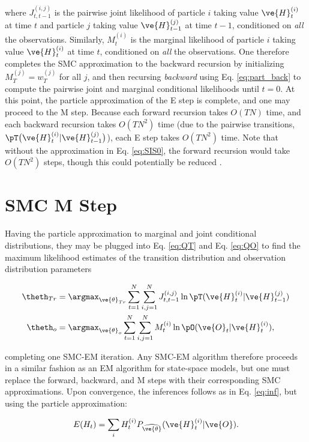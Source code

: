 \documentclass{article}
\begin{document}
\noindent where $J^{(i,j)}_{t,t-1}$ is the pairwise joint likelihood
of particle $i$ taking value $\ve{H}_t^{(i)}$ at time $t$ and particle
$j$ taking value $\ve{H}_{t-1}^{(j)}$ at time $t-1$, conditioned on
\emph{all} the observations.  Similarly, $M_t^{(i)}$ is the marginal
likelihood of particle $i$ taking value $\ve{H}_t^{(i)}$ at time $t$,
conditioned on \emph{all} the observations. One therefore completes
the SMC approximation to the backward recursion by initializing
$M_T^{(j)}=w_T^{(j)}$ for all $j$, and then recursing \emph{backward}
using Eq. \ref{eq:part_back} to compute the pairwise joint and marginal
conditional likelihoods until $t=0$.  At this point, the particle
approximation of the E step is complete, and one may proceed to the M
step. Because each forward recursion takes $O(TN)$ time, and each
backward recursion takes $O(TN^2)$ time (due to the pairwise
transitions, $\pT \big(\ve{H}^{(i)}_t | \ve{H}^{(j)}_{t-1} \big)$),
each E step takes $O(TN^2)$ time.  Note that without the approximation
in Eq. \ref{eq:SIS0}, the forward recursion would take $O(TN^2)$ steps,
though this could potentially be reduced  \cite{KlaasDoucet05}.

\section{SMC M Step}

Having the particle approximation to marginal and joint conditional distributions, they may be plugged into Eq. \ref{eq:QT} and Eq. \ref{eq:QO} to find the maximum likelihood estimates of the transition distribution and observation distribution parameters

\begin{align} \label{eq:smcQT}
\theth_{Tr} &= \argmax_{\ve{\theta}_{Tr}} \sum_{t=1}^N\sum_{i,j=1}^N J^{(i,j)}_{t,t-1}  \ln \pT
(\ve{H}_t^{(i)} |  \ve{H}_{t-1}^{(j)}) \\ \label{eq:smcQO}
\theth_o &= \argmax_{\ve{\theta}_o}  \sum_{t=1}^N \sum_{i,j=1}^N M^{(i)}_t \ln \pO (\ve{O}_t | \ve{H}_t^{(i)}),
\end{align}

\noindent completing one SMC-EM iteration.  Any SMC-EM algorithm therefore proceeds in a similar fashion as an EM algorithm for state-space models, but one must replace the forward, backward, and M steps with their corresponding SMC approximations. Upon convergence, the inferences follows as in Eq. \ref{eq:inf}, but using the particle approximation:

\begin{equation} \label{eq:smc_inf}
E(H_t) = \sum_i H_t^{(i)} P_{\widehat{\ve{\theta}}}(\ve{H}_t^{(i)} | \ve{O}).
\end{equation}
\end{document}

